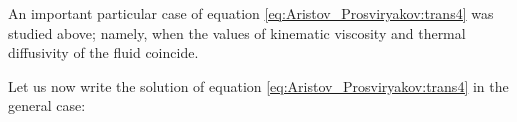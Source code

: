 \begin{figure}[h!]














\end{figure}









\newpage
















An important particular case of equation \eqref{eq:Aristov_Prosviryakov:trans4} was studied above; namely, when the values of kinematic viscosity and thermal diffusivity of the fluid coincide. 

Let us now write the solution of equation \eqref{eq:Aristov_Prosviryakov:trans4} in the general case:

